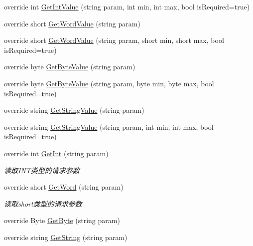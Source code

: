\begin{DoxyCompactItemize}
\item 
override int \mbox{\hyperlink{class_t_net_1_1_contract_1_1_http_get_a78a0c0c2143855f12212941cf17e5af0}{Get\+Int\+Value}} (string param, int min, int max, bool is\+Required=true)
\item 
override short \mbox{\hyperlink{class_t_net_1_1_contract_1_1_http_get_a36c1698d3ab3e6dcf49dd46d7d3b3478}{Get\+Word\+Value}} (string param)
\item 
override short \mbox{\hyperlink{class_t_net_1_1_contract_1_1_http_get_a2ee823780a1ca44bcf516a8b1d380e59}{Get\+Word\+Value}} (string param, short min, short max, bool is\+Required=true)
\item 
override byte \mbox{\hyperlink{class_t_net_1_1_contract_1_1_http_get_a3ccff46a3fda076f3c990959879a4c32}{Get\+Byte\+Value}} (string param)
\item 
override byte \mbox{\hyperlink{class_t_net_1_1_contract_1_1_http_get_ad924042121eb9623312921851ef2a1cf}{Get\+Byte\+Value}} (string param, byte min, byte max, bool is\+Required=true)
\item 
override string \mbox{\hyperlink{class_t_net_1_1_contract_1_1_http_get_a3a699f22e9dc9e02263097ebb345097c}{Get\+String\+Value}} (string param)
\item 
override string \mbox{\hyperlink{class_t_net_1_1_contract_1_1_http_get_a4c59458094b5b47c7753d78ab9844c8a}{Get\+String\+Value}} (string param, int min, int max, bool is\+Required=true)
\item 
override int \mbox{\hyperlink{class_t_net_1_1_contract_1_1_http_get_a0a566eefd2751c74d79360fe8bfdb397}{Get\+Int}} (string param)
\begin{DoxyCompactList}\small\item\em 读取\+I\+N\+T类型的请求参数 \end{DoxyCompactList}\item 
override short \mbox{\hyperlink{class_t_net_1_1_contract_1_1_http_get_a0b7f40b6bb3468dbd02512645538a12e}{Get\+Word}} (string param)
\begin{DoxyCompactList}\small\item\em 读取short类型的请求参数 \end{DoxyCompactList}\item 
override Byte \mbox{\hyperlink{class_t_net_1_1_contract_1_1_http_get_a26fb9f08e77c8a3d8f085db2b8444e8e}{Get\+Byte}} (string param)
\item 
override string \mbox{\hyperlink{class_t_net_1_1_contract_1_1_http_get_a886857fce91c42ba48baae7979e7d3cb}{Get\+String}} (string param)

\end{DoxyCompactItemize}
